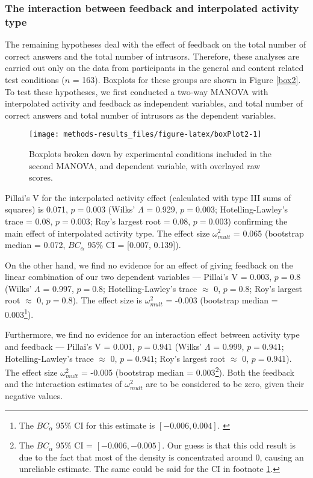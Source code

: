 \documentclass[11pt,]{article}
\let\rmarkdownfootnote\footnote%
\def\footnote{\protect\rmarkdownfootnote}
\begin{document}
\hypertarget{the-interaction-between-feedback-and-interpolated-activity-type}{%
\subsubsection{The interaction between feedback and interpolated
activity
type}\label{the-interaction-between-feedback-and-interpolated-activity-type}}

The remaining hypotheses deal with the effect of feedback on the total
number of correct answers and the total number of intrusors. Therefore,
these analyses are carried out only on the data from participants in the
general and content related test conditions (\(n\) = 163). Boxplots for
these groups are shown in Figure \ref{box2}. To test these hypotheses,
we first conducted a two-way MANOVA with interpolated activity and
feedback as independent variables, and total number of correct answers
and total number of intrusors as the dependent variables.

\begin{figure*}[h]

{\centering \texttt{[image: methods-results\_files/figure-latex/boxPlot2-1]} 

}

\caption{\label{box2} Boxplots broken down by experimental conditions included in the second MANOVA, and dependent variable, with overlayed raw scores.}\label{fig:boxPlot2}
\end{figure*}

Pillai's V for the interpolated activity effect (calculated with type
III sums of squares) is 0.071, \(p = 0.003\) (Wilks' \(\Lambda\) =
0.929, \(p = 0.003\); Hotelling-Lawley's trace = 0.08, \(p = 0.003\);
Roy's largest root = 0.08, \(p = 0.003\)) confirming the main effect of
interpolated activity type. The effect size \(\omega^2_{mult}\) = 0.065
(bootstrap median = 0.072, \(BC_\alpha\) 95\% CI = {[}0.007, 0.139{]}).

On the other hand, we find no evidence for an effect of giving feedback
on the linear combination of our two dependent variables --- Pillai's V
= 0.003, \(p = 0.8\) (Wilks' \(\Lambda\) = 0.997, \(p = 0.8\);
Hotelling-Lawley's trace \(\approx\) 0, \(p = 0.8\); Roy's largest root
\(\approx\) 0, \(p = 0.8\)). The effect size is \(\omega^2_{mult}\) =
-0.003 (bootstrap median = 0.003\footnote{
The \(BC_\alpha\) 95\% CI for this estimate is \([-0.006, 0.004]\).
\label{bca-ref}}).

Furthermore, we find no evidence for an interaction effect between
activity type and feedback --- Pillai's V = 0.001, \(p = 0.941\) (Wilks'
\(\Lambda\) = 0.999, \(p = 0.941\); Hotelling-Lawley's trace \(\approx\)
0, \(p = 0.941\); Roy's largest root \(\approx\) 0, \(p = 0.941\)). The
effect size \(\omega^2_{mult}\) = -0.005 (bootstrap median =
0.003\footnote{
The \(BC_\alpha\) 95\% CI = \([-0.006, -0.005]\).
Our guess is that this odd result is due to the fact that most of the density is concentrated
around 0, causing an unreliable estimate. The same could be said for the CI in
footnote \ref{bca-ref}.}). Both the feedback and the interaction
estimates of \(\omega^2_{mult}\) are to be considered to be zero, given
their negative values.
\end{document}
